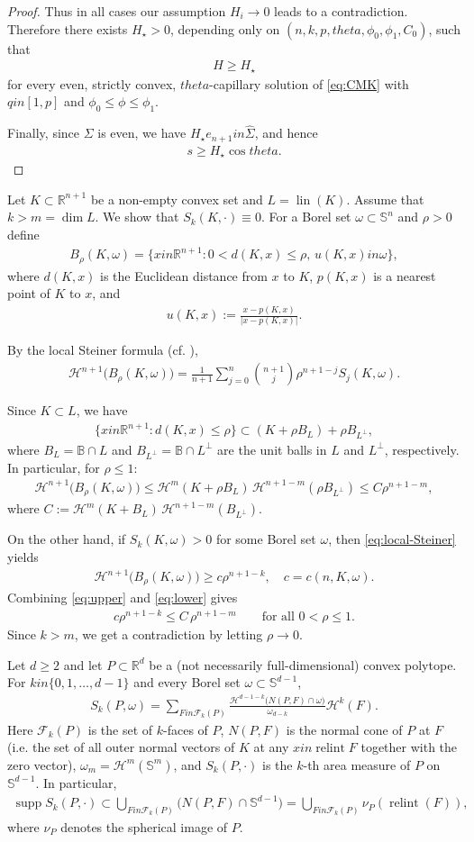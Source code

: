 \documentclass[12pt]{amsart}
\def\theta{theta}%
\def\in{in }%
\numberwithin{equation}{section}
\newcommand{\bbR}{\mathbb{R}}
\newcommand{\bbS}{\mathbb{S}}
\newcommand{\bbB}{\mathbb{B}}
\newcommand{\op}[1]{\operatorname{#1}}
\newcommand{\8}{\infty}
\newcommand{\Si}{\Sigma}
\newcommand{\cF}{\mathcal{F}}
\newcommand{\cH}{\mathcal{H}}
\DeclareMathOperator{\supp}{supp}
\newcommand{\abs}[1]{\lvert #1\rvert}
\newcommand{\eq}[1]{\begin{equation}\begin{alignedat}{2}#1\end{alignedat}\end{equation}}
\newcommand{\Sd}{\mathbb{S}^{d-1}}
\newcommand{\Hd}{\mathcal{H}}
\begin{document}
\begin{proof}
Thus in all cases our assumption $H_i\to 0$ leads to a contradiction. Therefore there exists $H_{\star}>0$, depending only on $(n,k,p,\theta,\phi_0,\phi_1,C_0)$, such that
\eq{
H\ge H_{\star}
}
for every even, strictly convex, $\theta$-capillary solution of \eqref{eq:CMK} with $q\in[1,p]$ and $\phi_0\le\phi\le\phi_1$.

Finally, since $\Si$ is even, we have $H_{\star} e_{n+1}\in\widehat{\Sigma}$, and hence
\eq{
s\ge H_{\star}\cos\theta.
}
\end{proof}

\begin{rem}\label{rem:Sk-vanish}
Let $K\subset \bbR^{n+1}$ be a non-empty convex set and $L=\op{lin}(K)$. Assume that $k>m=\dim L$. We show that $S_k(K,\cdot)\equiv0$. For a Borel set $\omega\subset \bbS^{n}$ and $\rho>0$ define
\eq{
B_\rho(K,\omega)=\{x\in\bbR^{n+1}: 0<d(K,x)\le \rho,\, u(K,x)\in\omega\},
}
where $d(K,x)$ is the Euclidean distance from $x$ to $K$, $p(K,x)$ is a nearest point of $K$ to $x$, and
\eq{
u(K,x):=\frac{x-p(K,x)}{\abs{x-p(K,x)}}.
}

By the local Steiner formula (cf. \cite[(4.13)]{Sch14}),
\eq{\label{eq:local-Steiner}
\cH^{n+1}\bigl(B_\rho(K,\omega)\bigr)
=\frac{1}{n+1}\sum_{j=0}^{n}\binom{n+1}{j}\rho^{n+1-j}S_j(K,\omega).
}

Since $K\subset L$, we have
\eq{
\{x\in\bbR^{n+1}: d(K,x)\le \rho\}\subset (K+\rho B_L)+\rho B_{L^\perp},
}
where $B_{L}=\bbB\cap L$ and $B_{L^\perp}=\bbB\cap L^{\perp}$ are the unit balls in $L$ and $L^\perp$, respectively. In particular, for $\rho\leq 1$:
\eq{\label{eq:upper}
\cH^{n+1}\bigl(B_\rho(K,\omega)\bigr)
\le \cH^{m}(K+\rho B_{L})\,\cH^{n+1-m}(\rho B_{L^\perp})
\le C\rho^{n+1-m},
}
where $C:=\cH^{m}(K+B_{L})\,\cH^{n+1-m}(B_{L^\perp})$.

On the other hand, if $S_k(K,\omega)>0$ for some Borel set $\omega$, then \eqref{eq:local-Steiner} yields
\eq{\label{eq:lower}
\cH^{n+1}\bigl(B_\rho(K,\omega)\bigr)\ge
 c\rho^{n+1-k},\quad c=c(n,K,\omega).
}
Combining \eqref{eq:upper} and \eqref{eq:lower} gives
\eq{
c\rho^{n+1-k}\le C\,\rho^{n+1-m}\qquad \text{for all }0<\rho\le 1.
}
Since $k>m$, we get a contradiction by letting $\rho\to0$.
\end{rem}


\begin{lemma}\label{lem:polytope-any-dim}
Let $d\ge 2$ and let $P\subset\mathbb{R}^d$ be a (not necessarily full-dimensional) convex
polytope. For $k\in\{0,1,\dots,d-1\}$ and every Borel set $\omega\subset \Sd$,
\eq{\label{eq:Sch-424}
S_k(P,\omega)=\sum_{F\in\cF_k(P)} \frac{\Hd^{d-1-k}\big(N(P,F)\cap \omega\big)}{\omega_{d-k}}
\Hd^{k}(F).
}
Here $\cF_k(P)$ is the set of $k$-faces of $P$, $N(P,F)$ is the normal cone of $P$ at $F$ (i.e. the set of all outer normal vectors of $K$ at any $x\in\operatorname{relint}F$ together with the zero vector),
$\omega_m=\Hd^{m}(\mathbb{S}^{m})$, and $S_k(P,\cdot)$ is the $k$-th area measure of $P$ on $\Sd$.
In particular,
\eq{
\supp S_k(P,\cdot) \subset \bigcup_{F\in\cF_k(P)} \big(N(P,F)\cap \Sd\big)
= \bigcup_{F\in\cF_k(P)} \nu_P(\op{relint}(F)),
}
where $\nu_P$ denotes the spherical image of $P$.
\end{lemma}
\end{document}
